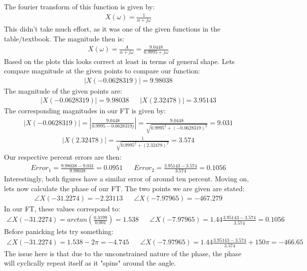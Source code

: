 \documentclass{article}
\begin{document}
The fourier transform of this function is given by:
\begin{align*}
X(\omega ) = \frac{1}{\alpha + j \omega}
\end{align*}
This didn't take much effort, as it was one of the given functions in the table/textbook. The magnitude then is:
\begin{align*}
X(\omega ) = \frac{A}{\alpha + j \omega} = \frac{9.0448}{0.9995 + j \omega}
\end{align*}
Based on the plots this looks correct at least in terms of general shape. Lets compare magnitude at the given points to compare our function:
\begin{align*}
|X(-0.0628319)| = 9.98038
\end{align*}
The magnitude of the given points are:
\begin{align*}
|X(-0.0628319)| = 9.98038 && |X(2.32478)| = 3.95143
\end{align*}
The corresponding magnitudes in our FT is given by:
\begin{align*}
|X(-0.0628319)| = |\frac{9.0448}{0.9995 - 0.0628319 j}| = \frac{9.0448}{\sqrt{0.9995^2 + (-0.0628319)^2}} = 9.031 
\end{align*}
\begin{align*}
|X(2.32478)| = \frac{1}{\sqrt{0.9995^2 + (2.32478)^2}} = 3.574
\end{align*}
Our respective percent errors are then:
\begin{align*}
Error_1 = \frac{9.98038-9.031}{9.98038} = 0.0951 && Error_2 = \frac{3.95143-3.574}{3.574} = 0.1056
\end{align*}
Interestingly, both figures have a similar error of around ten percent.
Moving on, lets now calculate the phase of our FT.
The two points we are given are stated:
\begin{align*}
\angle X(-31.2274) = -2.23113 && \angle X(-7.97965) = -467.279
\end{align*}
In our FT, these values correspond to:
\begin{align*}
\angle X(-31.2274) = arctan(\frac{0.3199}{0.001}) = 1.538 && \angle X(-7.97965) = 1.44 \frac{3.95143-3.574}{3.574} = 0.1056
\end{align*}
Before panicking lets try something:
\begin{align*}
\angle X(-31.2274) = 1.538 - 2\pi = -4.745 && \angle X(-7.97965) = 1.44 \frac{3.95143-3.574}{3.574} + 150\pi = -466.65
\end{align*}
The issue here is that due to the unconstrained nature of the phase, the phase will cyclically repeat itself as it "spins" around the angle.
\pagebreak
\end{document}

